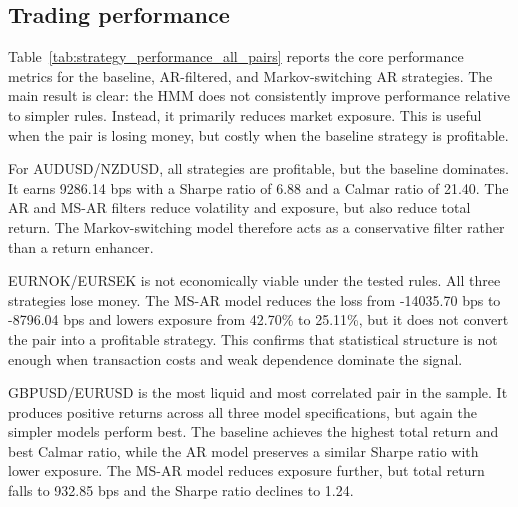\subsection{Trading performance}

Table~\ref{tab:strategy_performance_all_pairs} reports the core performance metrics for the baseline, AR-filtered, and Markov-switching AR strategies. The main result is clear: the HMM does not consistently improve performance relative to simpler rules. Instead, it primarily reduces market exposure. This is useful when the pair is losing money, but costly when the baseline strategy is profitable.

For AUDUSD/NZDUSD, all strategies are profitable, but the baseline dominates. It earns 9286.14 bps with a Sharpe ratio of 6.88 and a Calmar ratio of 21.40. The AR and MS-AR filters reduce volatility and exposure, but also reduce total return. The Markov-switching model therefore acts as a conservative filter rather than a return enhancer.

EURNOK/EURSEK is not economically viable under the tested rules. All three strategies lose money. The MS-AR model reduces the loss from -14035.70 bps to -8796.04 bps and lowers exposure from 42.70\% to 25.11\%, but it does not convert the pair into a profitable strategy. This confirms that statistical structure is not enough when transaction costs and weak dependence dominate the signal.

GBPUSD/EURUSD is the most liquid and most correlated pair in the sample. It produces positive returns across all three model specifications, but again the simpler models perform best. The baseline achieves the highest total return and best Calmar ratio, while the AR model preserves a similar Sharpe ratio with lower exposure. The MS-AR model reduces exposure further, but total return falls to 932.85 bps and the Sharpe ratio declines to 1.24.

